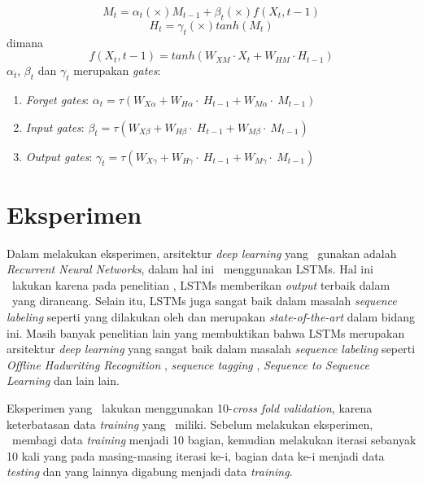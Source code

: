 \begin{enumerate}
	\begin{equation}\label{eq:mt3}
	M_{t}=\alpha_{t} (\times) M_{t-1} + \beta_{t} (\times) f(X_{t},{t-1})
	\end{equation}
	\begin{equation}\label{eq:ht3}
	H_{t}=\gamma_{t} (\times) tanh(M_{t})
	\end{equation}
	dimana
	\begin{equation}\label{eq:hf3}
	f(X_{t},{t-1})=tanh(W_{XM} \cdot X_{t} + W_{HM} \cdot H_{t-1})
	\end{equation}
	$ \alpha_{t} $, $ \beta_{t} $ dan $ \gamma_{t} $ merupakan \textit{gates}:
	\begin{enumerate}
	\item \textit{Forget gates}: $ \alpha_{t}=\tau(W_{X\alpha}+W_{H\alpha}\cdot~H_{t-1}+W_{M\alpha}\cdot~M_{t-1}) $
	\item \textit{Input gates}: $ \beta_{t}=\tau(W_{X\beta}+W_{H\beta}\cdot~H_{t-1}+W_{M\beta}\cdot~M_{t-1}) $
	\item \textit{Output gates}: $ \gamma_{t}=\tau(W_{X\gamma}+W_{H\gamma}\cdot~H_{t-1}+W_{M\gamma}\cdot~M_{t-1}) $
	\end{enumerate}
		
\end{enumerate}
	
\section{Eksperimen}
Dalam melakukan eksperimen, arsitektur \textit{deep learning} yang \saya~gunakan adalah \textit{Recurrent Neural Networks}, dalam hal ini \saya~menggunakan LSTMs. Hal ini \saya~lakukan karena pada penelitian \cite{mujiono2016new}, LSTMs memberikan \textit{output} terbaik dalam \mer~yang dirancang. Selain itu, LSTMs juga sangat baik dalam masalah \textit{sequence labeling} seperti yang dilakukan oleh \cite{graves2013speech} dan merupakan \textit{state-of-the-art} dalam bidang ini. Masih banyak penelitian lain yang membuktikan bahwa LSTMs merupakan arsitektur \textit{deep learning} yang sangat baik dalam masalah \textit{sequence labeling} seperti \textit{Offline Hadwriting Recognition} \citep{graves2009offline}, \textit{sequence tagging} \citep{huang2015bidirectional}, \textit{Sequence to Sequence Learning} \citep{NIPS2014_5346} dan lain lain.

Eksperimen yang \saya~lakukan menggunakan 10-\textit{cross fold validation}, karena keterbatasan data \textit{training} yang \saya~miliki. Sebelum melakukan eksperimen, \saya~membagi data \textit{training} menjadi 10 bagian, kemudian melakukan iterasi sebanyak 10 kali yang pada masing-masing iterasi ke-i, bagian data ke-i menjadi data \textit{testing} dan yang lainnya digabung menjadi data \textit{training}. 

